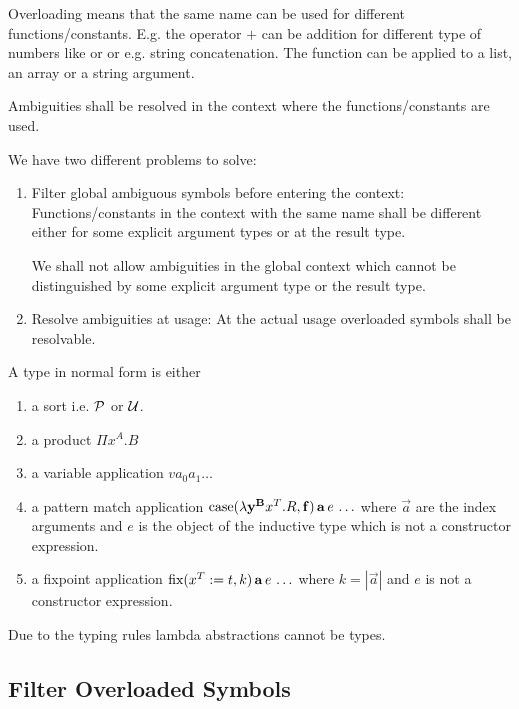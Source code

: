 Overloading means that the same name can be used for different
functions/constants. E.g. the operator $+$ can be addition for different type of
numbers like  or  or e.g. string concatenation. The
function  can be applied to a list, an array or a string argument.

Ambiguities shall be resolved in the context where the functions/constants are
used.

We have two different problems to solve:
\begin{enumerate}

\item Filter global ambiguous symbols before entering the context:
Functions/constants in the context with the same name shall be different either
for some explicit argument types or at the result type.

We shall not allow ambiguities in the global context which cannot be
distinguished by some explicit argument type or the result type.


\item Resolve ambiguities at usage: At the actual usage overloaded symbols shall
be resolvable.

\end{enumerate}

A type in normal form is either
\begin{enumerate}

\item a sort i.e. ${\cal{P}}$ or ${\cal{U}}$.

\item a product $\Pi x^A. B$

\item a variable application $v a_0 a_1 \ldots$

\item a pattern match application
    $\text{case}(\lambda \mathbf{y}^{\mathbf{B}} x^T. R, \mathbf{f}) \,\mathbf{a}\, e\, \ldots$
    where $\vec{a}$ are the index arguments and $e$ is the object of the
    inductive type which is not a constructor expression.

\item a fixpoint application
    $\text{fix}(x^T := t, k)\, \mathbf{a}\, e\, \ldots$
    where $k = |\vec{a}|$ and $e$ is not a constructor expression.
\end{enumerate}
%
Due to the typing rules lambda abstractions cannot be types.





\subsection{Filter Overloaded Symbols}


